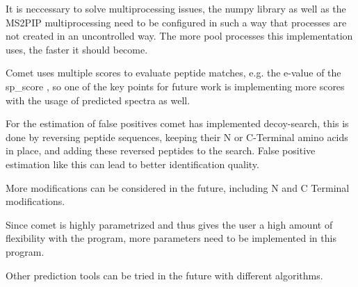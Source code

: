 \documentclass[11pt]{article}
\begin{document}
It is neccessary to solve multiprocessing issues, the numpy library as well as the MS2PIP multiprocessing need to be configured in such a way that processes are not created in an uncontrolled way. The more pool processes this implementation uses, the faster it should become.

Comet uses multiple scores to evaluate peptide matches, e.g. the e-value of the sp\_score , so one of the key points for future work is implementing more scores with the usage of predicted spectra as well.

For the estimation of false positives comet has implemented decoy-search, this is done by reversing peptide sequences, keeping their N or C-Terminal amino acids in place, and adding these reversed peptides to the search. False positive estimation like this can lead to better identification quality.

More modifications can be considered in the future, including N and C Terminal modifications.

Since comet is highly parametrized and thus gives the user a high amount of flexibility with the program, more parameters need to be implemented in this program.

Other prediction tools can be tried in the future with different algorithms.

\printbibliography
\end{document}
